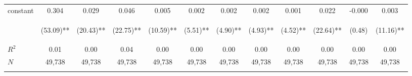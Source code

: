 \begin{tabular}{lccccccccccc}
\noalign{\smallskip}constant & 0.304 & 0.029 & 0.046 & 0.005 & 0.002 & 0.002 & 0.002 & 0.001 & 0.022 & -0.000 & 0.003\\
 & \begin{footnotesize}(53.09)**\end{footnotesize} & \begin{footnotesize}(20.43)**\end{footnotesize} & \begin{footnotesize}(22.75)**\end{footnotesize} & \begin{footnotesize}(10.59)**\end{footnotesize} & \begin{footnotesize}(5.51)**\end{footnotesize} & \begin{footnotesize}(4.90)**\end{footnotesize} & \begin{footnotesize}(4.93)**\end{footnotesize} & \begin{footnotesize}(4.52)**\end{footnotesize} & \begin{footnotesize}(22.64)**\end{footnotesize} & \begin{footnotesize}(0.48)\end{footnotesize} & \begin{footnotesize}(11.16)**\end{footnotesize}\\
\noalign{\smallskip}$R^2$ & 0.01 & 0.00 & 0.04 & 0.00 & 0.00 & 0.00 & 0.00 & 0.00 & 0.00 & 0.00 & 0.00\\
$N$ & 49,738 & 49,738 & 49,738 & 49,738 & 49,738 & 49,738 & 49,738 & 49,738 & 49,738 & 49,738 & 49,738\\
\noalign{\smallskip}\hline\hline\end{tabular}
